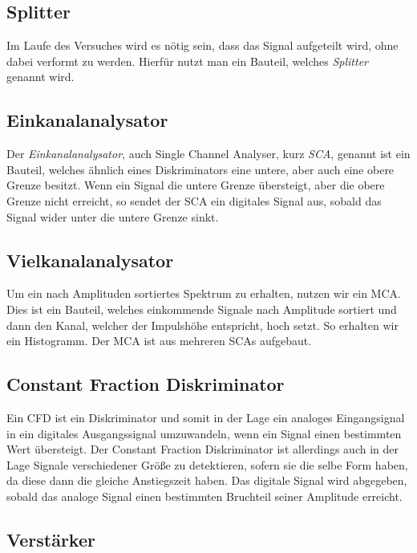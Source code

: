 \documentclass[11pt, ngerman, fleqn, DIV=15, headinclude, BCOR=2cm]{scrreprt}
\begin{document}
\subsection{Splitter}


Im Laufe des Versuches wird es nötig sein, dass das Signal aufgeteilt wird,
ohne dabei verformt zu werden. Hierfür nutzt man ein Bauteil, welches
\emph{Splitter}
genannt wird. 

\subsection{Einkanalanalysator}


Der \emph{Einkanalanalysator}, auch Single Channel Analyser, kurz \emph{SCA}, genannt ist ein
Bauteil, welches ähnlich eines Diskriminators eine untere, aber auch eine obere
Grenze besitzt. Wenn ein Signal die untere Grenze übersteigt, aber die obere
Grenze nicht erreicht, so sendet der SCA ein digitales Signal aus, sobald das
Signal wider unter die untere Grenze sinkt.

\subsection{Vielkanalanalysator}

Um ein nach Amplituden sortiertes Spektrum zu erhalten, nutzen wir ein MCA.
Dies ist ein Bauteil, welches einkommende Signale nach Amplitude sortiert und
dann den Kanal, welcher der Impulshöhe entspricht, hoch setzt. So erhalten wir ein
Histogramm. Der MCA ist aus mehreren SCAs aufgebaut.

\subsection{Constant Fraction Diskriminator}

Ein CFD ist ein Diskriminator und somit in der Lage ein analoges
Eingangsignal in ein digitales Ausgangssignal umzuwandeln, wenn ein Signal einen
bestimmten Wert übersteigt.
Der Constant Fraction Diskriminator ist allerdings auch in der Lage Signale
verschiedener Größe zu detektieren, sofern sie die selbe Form haben, da diese
dann die gleiche Anstiegszeit haben. Das digitale Signal wird abgegeben, sobald
das analoge Signal einen bestimmten Bruchteil seiner Amplitude erreicht.

\subsection{Verstärker}
\end{document}
